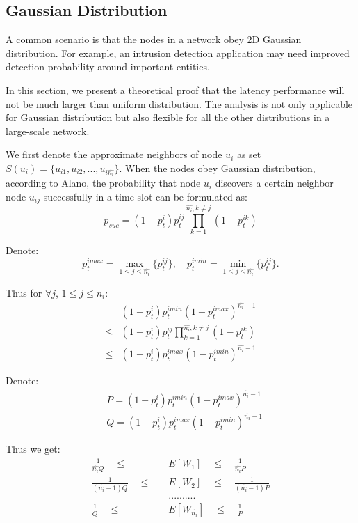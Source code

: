 










\subsection{Gaussian Distribution}
\label{normal}
A common scenario is that the nodes in a network obey 2D Gaussian distribution.
For example, an intrusion detection application may need improved detection 
probability around important entities\cite{wang2013gaussian}.

In this section, we present a theoretical proof that the latency performance
will not be much larger than uniform distribution.
The analysis is not only applicable for Gaussian distribution
but also flexible for all the other distributions in a large-scale network.

We first denote the approximate neighbors of node $u_i$
as set $S(u_i) = \{u_{i1},u_{i2},...,u_{i\hat{n_i}}\}$.
When the nodes obey Gaussian distribution, according to Alano, 
the probability that node $u_i$ discovers a certain 
neighbor node $u_{ij}$ successfully in a time slot can be formulated as:
$$
p_{suc} = (1-p_t^i)p_t^{ij}\prod_{ k=1}^{\hat{n_i}, k\neq j}(1-p_t^{ik})
$$

Denote:
$$
p_t^{imax} = \max_{1 \leq j \leq \hat{n_i}}\{p_t^{ij}\}, \quad p_t^{imin} = \min_{1 \leq j \leq \hat{n_i}}\{p_t^{ij}\}.
$$

Thus for $\forall j$, $1 \leq j \leq n_i$:
\begin{align*}
&(1-p_t^i)p_t^{imin}{(1-p_t^{imax})}^{\hat{n_i}-1} \\
\leq &(1-p_t^i)p_t^{ij}\prod_{ k=1}^{\hat{n_i}, k\neq j}(1-p_t^{ik}) \\
\leq &(1-p_t^i)p_t^{imax}{(1-p_t^{imin})}^{\hat{n_i}-1} 
\end{align*}

Denote:
\begin{align*}
&P = (1-p_t^i)p_t^{imin}{(1-p_t^{imax})}^{\hat{n_i}-1}  \\
&Q = (1-p_t^i)p_t^{imax}{(1-p_t^{imin})}^{\hat{n_i}-1} 
\end{align*}

Thus we get:
\begin{align*}
\frac{1}{\hat{n_i}Q} \quad \leq \quad &E[W_1] \quad \leq \quad \frac{1}{\hat{n_i}P} \\
\frac{1}{(\hat{n_i}-1)Q} \quad \leq \quad &E[W_2] \quad \leq \quad \frac{1}{(\hat{n_i}-1)P} \\
& ..........\\
\frac{1}{Q} \quad \leq \quad &E[W_{\hat{n_i}}] \quad \leq \quad \frac{1}{P} 
\end{align*}

